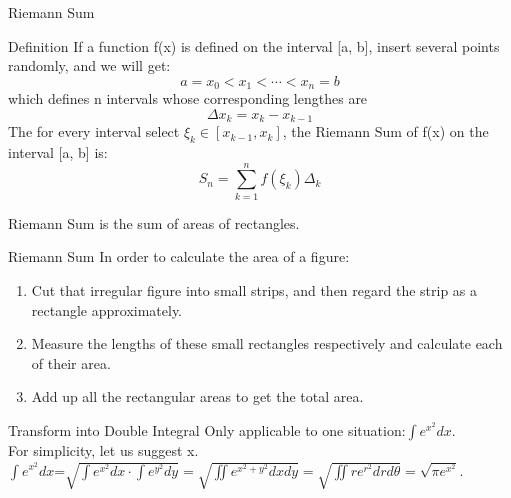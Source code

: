 \documentclass{beamer}
\begin{document}

\begin{frame}{Riemann Sum}
    \begin{block}{Definition}
    If a function f(x) is defined on the interval [a, b], insert several points randomly, and we will get:
    $$a=x_0<x_1<\cdots<x_n=b$$
    which defines n intervals whose corresponding lengthes are $$\Delta x_k=x_k-x_{k-1}$$
    The for every interval select $\xi_k\in [x_{k-1},x_k]$, the Riemann Sum  of f(x) on the interval [a, b] is: $$S_n=\sum\limits_{k=1}^n f(\xi_k) \Delta_k$$
    \end{block}
    Riemann Sum is the sum of areas of rectangles.
\end{frame}

\begin{frame}{Riemann Sum}
    In order to calculate the area of a figure:
    \begin{enumerate}
        \item Cut that irregular figure into small strips, and then regard the strip as a rectangle approximately.
        \item Measure the lengths of these small rectangles respectively and calculate each of their area.
        \item Add up all the rectangular areas to get the total area.
    \end{enumerate}
\end{frame}


\begin{frame}{Transform into Double Integral}
    Only applicable to one situation:$\int e^{x^2}dx$.\\
    For simplicity, let us suggest x.\\
    $\int e^{x^2}dx$=$\sqrt{\int e^{x^2}dx\cdot\int e^{y^2}dy}=\sqrt{\iint e^{x^2+y^2}dxdy}=\sqrt{\iint re^{r^2}drd\theta}=\sqrt{\pi e^{x^2}}$.
\end{frame}
\end{document}
